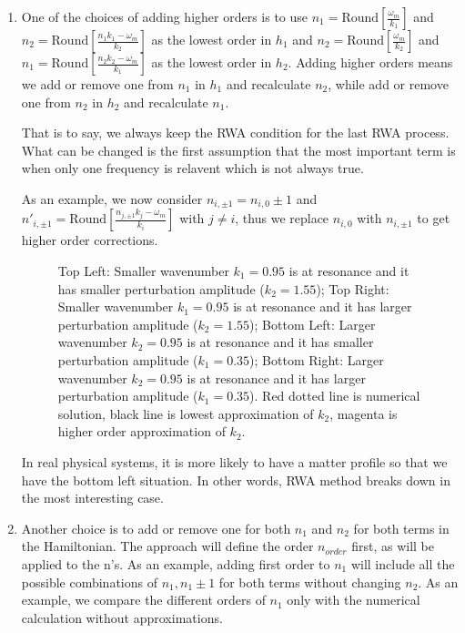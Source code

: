 \documentclass[letterpaper,12pt,english]{sphinxmanual}
\begin{document}
\begin{enumerate}
\item {} 
One of the choices of adding higher orders is to use \(n_1=\mathrm{Round}\left[ \frac{\omega_m}{k_1} \right]\) and \(n_2=\mathrm{Round}\left[ \frac{ n_1  k_1 - \omega_m }{k_2} \right]\) as the lowest order in \(h_1\) and \(n_2=\mathrm{Round}\left[ \frac{\omega_m}{k_2} \right]\) and \(n_1=\mathrm{Round}\left[ \frac{ n_2  k_2 - \omega_m }{k_1} \right]\) as the lowest order in \(h_2\). Adding higher orders means we add or remove one from \(n_1\) in \(h_1\) and recalculate \(n_2\), while add or remove one from \(n_2\) in \(h_2\) and recalculate \(n_1\).

That is to say, we always keep the RWA condition for the last RWA process. What can be changed is the first assumption that the most important term is when only one frequency is relavent which is not always true.

As an example, we now consider \(n_{i,\pm 1}=n_{i,0}\pm 1\) and \(n'_{i,\pm 1} =  \mathrm{Round}\left[ \frac{ n_{j,\pm 1} k_j - \omega_m }{k_i} \right]\) with \(j\neq i\), thus we replace \(n_{i,0}\) with \(n_{i,\pm 1}\) to get higher order corrections.
\begin{figure}[htbp]
\centering
\capstart

\noindent{}
\caption{Top Left: Smaller wavenumber \(k_1=0.95\) is at resonance and it has smaller perturbation amplitude (\(k_2=1.55\));
Top Right: Smaller wavenumber \(k_1=0.95\) is at resonance and it has larger perturbation amplitude (\(k_2=1.55\));
Bottom Left: Larger wavenumber \(k_2=0.95\) is at resonance and it has smaller perturbation amplitude (\(k_1=0.35\));
Bottom Right: Larger wavenumber \(k_2=0.95\) is at resonance and it has larger perturbation amplitude (\(k_1=0.35\)).
Red dotted line is numerical solution, black line is lowest approximation of \(k_2\), magenta is higher order approximation of \(k_2\).}\label{\detokenize{matter-stimulated/two-frequency:id2}}\end{figure}

In real physical systems, it is more likely to have a matter profile so that we have the bottom left situation. In other words, RWA method breaks down in the most interesting case.

\item {} 
Another choice is to add or remove one for both \(n_1\) and \(n_2\) for both terms in the Hamiltonian. The approach will define the order \(n_{order}\) first, as will be applied to the n's. As an example, adding first order to \(n_1\) will include all the possible combinations of \(n_1,n_1\pm 1\) for both terms without changing \(n_2\). As an example, we compare the different orders of \(n_1\) only with the numerical calculation without approximations.
\begin{figure}[htbp]
\centering
\capstart


\end{figure}
\end{enumerate}
\end{document}
